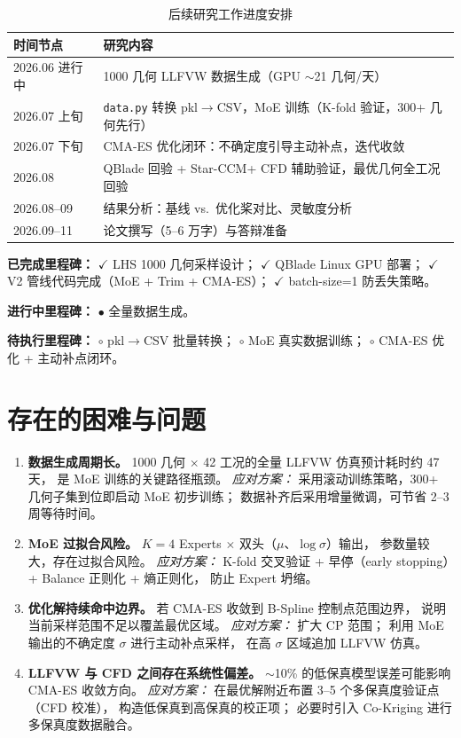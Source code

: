 \begin{table}[htbp]
\centering
\caption{后续研究工作进度安排}
\label{tab:future_plan}
\begin{tabular}{ll}
\toprule
\textbf{时间节点} & \textbf{研究内容} \\
\midrule
2026.06 进行中 & 1000 几何 LLFVW 数据生成（GPU $\sim$21 几何/天） \\
2026.07 上旬 & \texttt{data.py} 转换 pkl$\rightarrow$CSV，MoE 训练（K-fold 验证，300+ 几何先行） \\
2026.07 下旬 & CMA-ES 优化闭环：不确定度引导主动补点，迭代收敛 \\
2026.08 & QBlade 回验 + Star-CCM+ CFD 辅助验证，最优几何全工况回验 \\
2026.08--09 & 结果分析：基线 vs.\ 优化桨对比、灵敏度分析 \\
2026.09--11 & 论文撰写（5--6 万字）与答辩准备 \\
\bottomrule
\end{tabular}
\end{table}

\textbf{已完成里程碑：}
$\checkmark$ LHS 1000 几何采样设计；
$\checkmark$ QBlade Linux GPU 部署；
$\checkmark$ V2 管线代码完成（MoE + Trim + CMA-ES）；
$\checkmark$ batch-size=1 防丢失策略。

\textbf{进行中里程碑：}
$\bullet$ 全量数据生成。

\textbf{待执行里程碑：}
$\circ$ pkl$\rightarrow$CSV 批量转换；
$\circ$ MoE 真实数据训练；
$\circ$ CMA-ES 优化 + 主动补点闭环。

\section{存在的困难与问题}

\begin{enumerate}
  \item \textbf{数据生成周期长。}
        1000 几何 $\times$ 42 工况的全量 LLFVW 仿真预计耗时约 47 天，
        是 MoE 训练的关键路径瓶颈。
        \emph{应对方案：}
        采用滚动训练策略，300+ 几何子集到位即启动 MoE 初步训练；
        数据补齐后采用增量微调，可节省 2--3 周等待时间。
  \item \textbf{MoE 过拟合风险。}
        $K=4$ Experts $\times$ 双头（$\mu$、$\log\sigma$）输出，
        参数量较大，存在过拟合风险。
        \emph{应对方案：}
        K-fold 交叉验证 + 早停（early stopping）+ Balance 正则化 + 熵正则化，
        防止 Expert 坍缩。
  \item \textbf{优化解持续命中边界。}
        若 CMA-ES 收敛到 B-Spline 控制点范围边界，
        说明当前采样范围不足以覆盖最优区域。
        \emph{应对方案：}
        扩大 CP 范围；
        利用 MoE 输出的不确定度 $\sigma$ 进行主动补点采样，
        在高 $\sigma$ 区域追加 LLFVW 仿真。
  \item \textbf{LLFVW 与 CFD 之间存在系统性偏差。}
        $\sim$10\% 的低保真模型误差可能影响 CMA-ES 收敛方向。
        \emph{应对方案：}
        在最优解附近布置 3--5 个多保真度验证点（CFD 校准），
        构造低保真到高保真的校正项；
        必要时引入 Co-Kriging 进行多保真度数据融合。
\end{enumerate}

